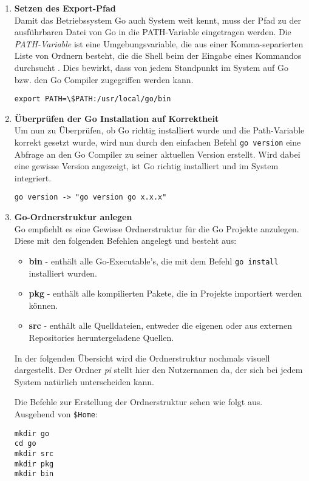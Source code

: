 \begin{enumerate}
\item \textbf{Setzen des Export-Pfad} \\
Damit das Betriebssystem Go auch System weit kennt, muss der Pfad zu der
ausführbaren Datei von Go in die PATH-Variable eingetragen werden. Die
\textit{PATH-Variable} ist eine Umgebungsvariable, die aus einer
Komma-separierten Liste von Ordnern besteht, die die Shell beim der Eingabe
eines Kommandos durchsucht \autocite{quigley_2000}. Dies bewirkt, dass von
jedem Standpunkt im System auf Go bzw. den Go Compiler zugegriffen werden kann.
\begin{lstlisting}
export PATH=\$PATH:/usr/local/go/bin
\end{lstlisting}

\item \textbf{Überprüfen der Go Installation auf Korrektheit} \\
Um nun zu Überprüfen, ob Go richtig installiert wurde und die Path-Variable
korrekt gesetzt wurde, wird nun durch den einfachen Befehl \verb|go version|
eine Abfrage an den Go Compiler zu seiner aktuellen Version erstellt. Wird
dabei eine gewisse Version angezeigt, ist Go richtig installiert und im System
integriert.
\begin{lstlisting}
go version -> "go version go x.x.x"
\end{lstlisting}

\item \textbf{Go-Ordnerstruktur anlegen} \\
Go empfiehlt es eine Gewisse Ordnerstruktur für die Go Projekte anzulegen.
Diese mit den folgenden Befehlen angelegt und besteht aus:
\begin{itemize}
\item \textbf{bin} - enthält alle Go-Executable's, die mit dem Befehl \verb|go install| installiert wurden.
\item \textbf{pkg} - enthält alle kompilierten Pakete, die in Projekte importiert werden können. 
\item \textbf{src} - enthält alle Quelldateien, entweder die eigenen oder aus externen Repositories heruntergeladene Quellen.
\end{itemize}
In der folgenden Übersicht wird die Ordnerstruktur nochmals visuell
dargestellt. Der Ordner \textit{pi} stellt hier den Nutzernamen da, der sich
bei jedem System natürlich unterscheiden kann. \\
\begin{minipage}[t]{\textwidth}
Die Befehle zur Erstellung der Ordnerstruktur sehen wie folgt aus. \\
Ausgehend von \verb|$Home|:
\begin{lstlisting}[caption={Erstellung der Go Ordnerstruktur}]
mkdir go
cd go
mkdir src
mkdir pkg
mkdir bin
\end{lstlisting}
\end{minipage}


\end{enumerate}

